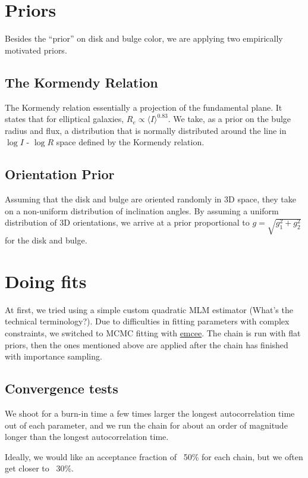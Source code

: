 \documentclass{article}
\newcommand{\comment}[1]{{\color{red} (#1)}}
\begin{document}
\section{Priors}
Besides the ``prior'' on disk and bulge color, we are applying two 
empirically motivated priors.
\subsection{The Kormendy Relation}
The Kormendy relation essentially a projection of the fundamental
plane.  It states that for elliptical galaxies, 
$R_e \propto \langle I \rangle^{0.83}$.  
We take, as a prior on the bulge radius and flux, a
distribution that is normally distributed around the line in $\log I$
- $\log R$ space defined by the Kormendy relation.

\subsection{Orientation Prior}
Assuming that the disk and bulge are oriented randomly in 3D space, 
they take on a non-uniform distribution of inclination angles.  By
assuming a uniform distribution of 3D orientations, we arrive at a
 prior proportional to $g = \sqrt{g_1^2 + g_2^2}$ for the disk and bulge.

\section{Doing fits}
At first, we tried using a simple custom quadratic MLM estimator
\comment{What's the technical terminology?}.  Due to difficulties in
fitting parameters with complex constraints, we switched to MCMC
fitting with \href{http://dan.iel.fm/emcee/current/}{emcee}.  The
chain is run with flat priors, then the ones mentioned above are
applied after the chain has finished with importance sampling.

\subsection{Convergence tests}
We shoot for a burn-in time a few times larger the longest
autocorrelation time out of each parameter, and we run the chain for
about an order of magnitude longer than the longest autocorrelation
time.

Ideally, we would like an acceptance fraction of ~50\% for each chain, but 
we often get closer to ~30\%.
\end{document}
